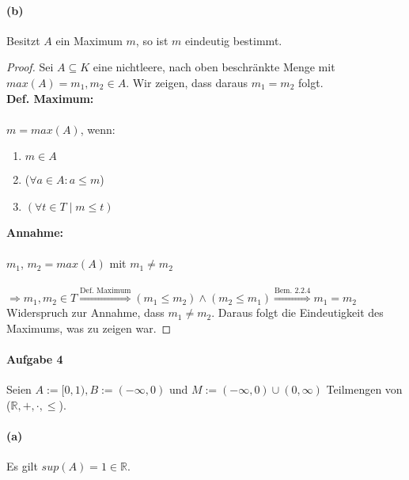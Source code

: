 \documentclass[12pt, letterpaper]{article}
\begin{document}
\paragraph{(b)} Besitzt $A$ ein Maximum $m$, so ist $m$ eindeutig bestimmt.

\begin{proof}

\noindent Sei $A \subseteq K$ eine nichtleere, nach oben beschränkte Menge mit $max(A) = m_1, m_2 \in A$. Wir zeigen, dass daraus $m_1 = m_2$ folgt.\\

\noindent\textbf{Def. Maximum:}\\ \\
\noindent$m = max(A)$, wenn:
\begin{enumerate}
    \item $m \in A$
    \item ($\forall a \in A: a \leq m$)
    \item $(\forall t \in T \mid m \leq t)$
\end{enumerate}
\noindent\textbf{Annahme:}\\ \\
\noindent $m_1$, $m_2 = max(A)$ mit $m_1 \neq m_2$\\ \\
\noindent $\Rightarrow m_1, m_2 \in T \overset{\text{Def. Maximum}}{\Rightarrow} (m_1 \leq m_2) \land (m_2 \leq m_1) \overset{\text{Bem. 2.2.4}}{\Rightarrow} m_1 = m_2$\\

\noindent Widerspruch zur Annahme, dass $m_1 \neq m_2$. Daraus folgt die Eindeutigkeit des Maximums, was zu zeigen war.

\end{proof}

\paragraph{Aufgabe 4}

Seien $A := [0, 1), B := (-\infty, 0)$ und $M := (-\infty, 0) \cup (0, \infty)$ Teilmengen von ($\mathbb{R}, +, \cdot, \leq$). 

\paragraph{(a)} Es gilt $sup(A) = 1 \in \mathbb{R}$.
\end{document}
